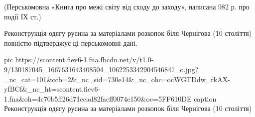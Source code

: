 (Перськомовна «Книга про межі світу від сходу до заходу»,  написана 982 р. про події ІХ ст.)

Реконструкція одягу русина за матеріалами розкопок біля Чернігова (10 століття) повністю підтверджує ці перськомовні дані.

\ifcmt
pic https://scontent.fiev6-1.fna.fbcdn.net/v/t1.0-9/130187045_1667631643408504_1062253342904546847_o.jpg?_nc_cat=101&ccb=2&_nc_sid=730e14&_nc_ohc=ocWGTDdw_rkAX-yfBCf&_nc_ht=scontent.fiev6-1.fna&oh=4c70b5ff26d71ccad82facff0074e150&oe=5FF610DE
caption Реконструкція одягу русина за матеріалами розкопок біля Чернігова (10 століття)
\fi
